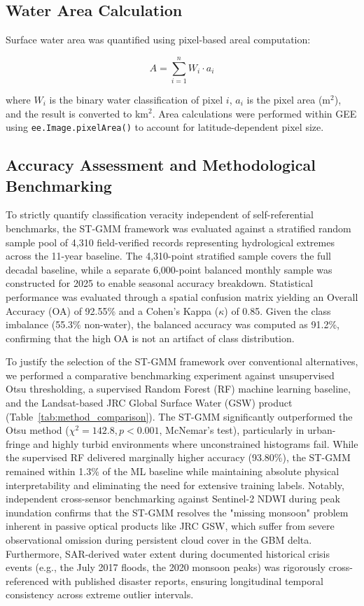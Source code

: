 \documentclass[fleqn,10pt,twocolumn]{article}
\begin{document}
\subsection{Water Area Calculation}

Surface water area was quantified using pixel-based areal computation:

\begin{equation}
A = \sum_{i=1}^{n} W_i \cdot a_i
\label{eq:area}
\end{equation}

where $W_i$ is the binary water classification of pixel $i$, $a_i$ is the pixel area (m$^{2}$), and the result is converted to km$^{2}$. Area calculations were performed within GEE using \texttt{ee.Image.pixelArea()} to account for latitude-dependent pixel size.

\subsection{Accuracy Assessment and Methodological Benchmarking}
\label{sec:validation}

To strictly quantify classification veracity independent of self-referential benchmarks, the ST-GMM framework was evaluated against a stratified random sample pool of 4,310 field-verified records representing hydrological extremes across the 11-year baseline. The 4,310-point stratified sample covers the full decadal baseline, while a separate 6,000-point balanced monthly sample was constructed for 2025 to enable seasonal accuracy breakdown. Statistical performance was evaluated through a spatial confusion matrix yielding an Overall Accuracy (OA) of 92.55\% and a Cohen's Kappa ($\kappa$) of 0.85. Given the class imbalance (55.3\% non-water), the balanced accuracy was computed as 91.2\%, confirming that the high OA is not an artifact of class distribution.

To justify the selection of the ST-GMM framework over conventional alternatives, we performed a comparative benchmarking experiment against unsupervised Otsu thresholding, a supervised Random Forest (RF) machine learning baseline, and the Landsat-based JRC Global Surface Water (GSW) product (Table~\ref{tab:method_comparison}). The ST-GMM significantly outperformed the Otsu method ($\chi^2 = 142.8, p < 0.001$, McNemar's test), particularly in urban-fringe and highly turbid environments where unconstrained histograms fail. While the supervised RF delivered marginally higher accuracy (93.80\%), the ST-GMM remained within 1.3\% of the ML baseline while maintaining absolute physical interpretability and eliminating the need for extensive training labels. Notably, independent cross-sensor benchmarking against Sentinel-2 NDWI during peak inundation confirms that the ST-GMM resolves the "missing monsoon" problem inherent in passive optical products like JRC GSW, which suffer from severe observational omission during persistent cloud cover in the GBM delta. Furthermore, SAR-derived water extent during documented historical crisis events (e.g., the July 2017 floods, the 2020 monsoon peaks) was rigorously cross-referenced with published disaster reports, ensuring longitudinal temporal consistency across extreme outlier intervals.
\end{document}
